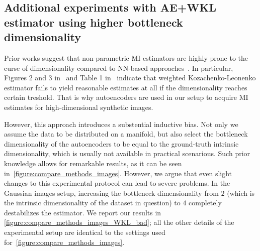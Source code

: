 \subsection{Additional experiments with AE+WKL estimator using higher bottleneck dimensionality}
\label{appendix:WKL_bad}

Prior works suggest that non-parametric MI estimators are highly prone to the curse of dimensionality compared to NN-based approaches~\cite{goldfeld2020convergence_of_SEM_entropy_estimation,czyz2023beyond_normal,butakov2024normflows}.
In particular, Figures 2 and 3 in~\cite{goldfeld2020convergence_of_SEM_entropy_estimation} and Table 1 in~\cite{butakov2024normflows} indicate that weighted Kozachenko-Leonenko estimator fails to yield reasonable estimates at all if the dimensionality reaches certain treshold.
That is why autoencoders are used in our setup to acquire MI estimates for high-dimensional synthetic images.

However, this approach introduces a substential inductive bias.
Not only we assume the data to be distributed on a manifold, but also select the bottleneck dimensionality of the autoencoders to be equal to the ground-truth intrinsic dimensionality, which is usually not available in practical scenarious.
Such prior knowledge allows for remarkable results, as it can be seen in~\cref{figure:compare_methods_images}.
However, we argue that even slight changes to this experimental protocol can lead to severe problems.
In the Gaussian images setup, increasing the bottleneck dimensionality from $ 2 $ (which is the intrinsic dimensionality of the dataset in question) to $ 4 $ completely destabilizes the estimator.
We report our results in \cref{figure:compare_methods_images_WKL_bad}; all the other details of the experimental setup are identical to the settings used for~\cref{figure:compare_methods_images}.


